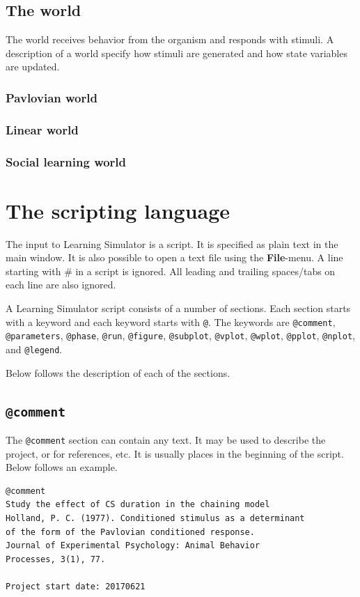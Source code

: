 \documentclass[11pt]{article}
\begin{document}
\subsection{The world}
The world receives behavior from the organism and responds with stimuli.
A description of a world specify how stimuli are generated and how state
variables are updated.

\subsubsection{Pavlovian world}

\subsubsection{Linear world}

\subsubsection{Social learning world}



\section{The scripting language}
The input to Learning Simulator is a script. It is specified as plain text in the main window. It is also possible to open a text file using the \textbf{File}-menu. A line starting with \# in a script is ignored. All leading and trailing spaces/tabs on each line are also ignored.

A Learning Simulator script consists of a number of sections. Each section starts with a keyword and each keyword starts with \verb|@|. The keywords are
\verb|@comment|, 
\verb|@parameters|,
\verb|@phase|,
\verb|@run|,
\verb|@figure|,
\verb|@subplot|,
\verb|@vplot|,
\verb|@wplot|,
\verb|@pplot|,
\verb|@nplot|, and
\verb|@legend|.

Below follows the description of each of the sections. 

\subsection{\texttt{@comment}}
The {\tt @comment} section can contain any text. It may be used to describe the project, or for references, etc. It is usually places in the beginning of the script. Below follows an example.
\begin{lstlisting}[caption={An example of a \texttt{@comment} section}]
@comment
Study the effect of CS duration in the chaining model
Holland, P. C. (1977). Conditioned stimulus as a determinant
of the form of the Pavlovian conditioned response. 
Journal of Experimental Psychology: Animal Behavior
Processes, 3(1), 77.

Project start date: 20170621
\end{lstlisting}
\end{document}
